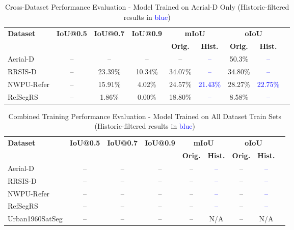 \begin{table}[H]
\centering
\caption{Cross-Dataset Performance Evaluation - Model Trained on Aerial-D Only (Historic-filtered results in \textcolor{blue}{blue})}
\label{tab:cross_dataset_results}
\begin{tabular}{@{}lcccccccc@{}}
\toprule
\textbf{Dataset} & \textbf{IoU@0.5} & \textbf{IoU@0.7} & \textbf{IoU@0.9} & \multicolumn{2}{c}{\textbf{mIoU}} & \multicolumn{2}{c}{\textbf{oIoU}} \\
\cmidrule(lr){5-6} \cmidrule(lr){7-8}
 & & & & \textbf{Orig.} & \textbf{Hist.} & \textbf{Orig.} & \textbf{Hist.} \\
\midrule
Aerial-D & -- & -- & -- & -- & \textcolor{blue}{--} & 50.3\% & \textcolor{blue}{--} \\
RRSIS-D & -- & 23.39\% & 10.34\% & 34.07\% & \textcolor{blue}{--} & 34.80\% & \textcolor{blue}{--} \\
NWPU-Refer & -- & 15.91\% & 4.02\% & 24.57\% & \textcolor{blue}{21.43\%} & 28.27\% & \textcolor{blue}{22.75\%} \\
RefSegRS & -- & 1.86\% & 0.00\% & 18.80\% & \textcolor{blue}{--} & 8.58\% & \textcolor{blue}{--} \\
\bottomrule
\end{tabular}
\end{table}

\begin{table}[H]
\centering
\caption{Combined Training Performance Evaluation - Model Trained on All Dataset Train Sets (Historic-filtered results in \textcolor{blue}{blue})}
\label{tab:combined_training_results}
\begin{tabular}{@{}lcccccccc@{}}
\toprule
\textbf{Dataset} & \textbf{IoU@0.5} & \textbf{IoU@0.7} & \textbf{IoU@0.9} & \multicolumn{2}{c}{\textbf{mIoU}} & \multicolumn{2}{c}{\textbf{oIoU}} \\
\cmidrule(lr){5-6} \cmidrule(lr){7-8}
 & & & & \textbf{Orig.} & \textbf{Hist.} & \textbf{Orig.} & \textbf{Hist.} \\
\midrule
Aerial-D & -- & -- & -- & -- & \textcolor{blue}{--} & -- & \textcolor{blue}{--} \\
RRSIS-D & -- & -- & -- & -- & \textcolor{blue}{--} & -- & \textcolor{blue}{--} \\
NWPU-Refer & -- & -- & -- & -- & \textcolor{blue}{--} & -- & \textcolor{blue}{--} \\
RefSegRS & -- & -- & -- & -- & \textcolor{blue}{--} & -- & \textcolor{blue}{--} \\
Urban1960SatSeg & -- & -- & -- & -- & N/A & -- & N/A \\
\bottomrule
\end{tabular}
\end{table}

